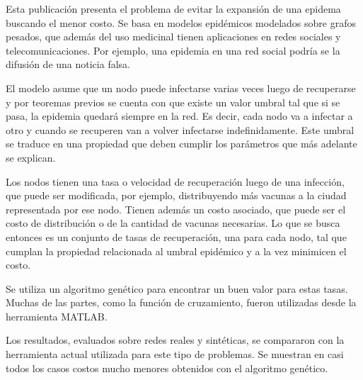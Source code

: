 Esta publicación presenta el problema de evitar la expansión de una epidema buscando el menor costo. Se basa en modelos epidémicos modelados sobre grafos pesados, que además del uso medicinal tienen aplicaciones en redes sociales y telecomunicaciones. Por ejemplo, una epidemia en una red social podría se la difusión de una noticia falsa.

El modelo asume que un nodo puede infectarse varias veces luego de recuperarse y por teoremas previos se cuenta con que existe un valor umbral tal que si se pasa, la epidemia quedará siempre en la red. Es decir, cada nodo va a infectar a otro y cuando se recuperen van a volver infectarse indefinidamente. Este umbral se traduce en una propiedad que deben cumplir los parámetros que más adelante se explican.

Los nodos tienen una tasa o velocidad de recuperación luego de una infección, que puede ser modificada, por ejemplo, distribuyendo más vacunas a la ciudad representada por ese nodo. Tienen además un costo asociado, que puede ser el costo de distribución o de la cantidad de vacunas necesarias. Lo que se busca entonces es un conjunto de tasas de recuperación, una para cada nodo, tal que cumplan la propiedad relacionada al umbral epidémico y a la vez minimicen el costo.

Se utiliza un algoritmo genético para encontrar un buen valor para estas tasas. Muchas de las partes, como la función de cruzamiento, fueron utilizadas desde la herramienta MATLAB.

Los resultados, evaluados sobre redes reales y sintéticas, se compararon con la herramienta actual utilizada para este tipo de problemas. Se muestran en casi todos los casos costos mucho menores obtenidos con el algoritmo genético.

